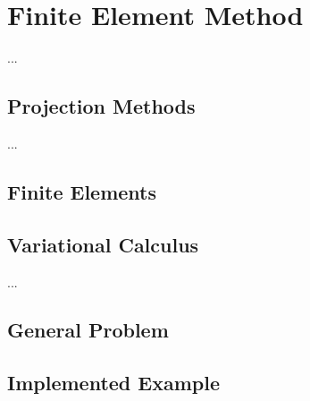 \clearpage
\chapter{Finite Element Method}
...

\section{Projection Methods}
...
\section{Finite Elements}

\section{Variational Calculus}
...
\section{General Problem}

\section{Implemented Example}


